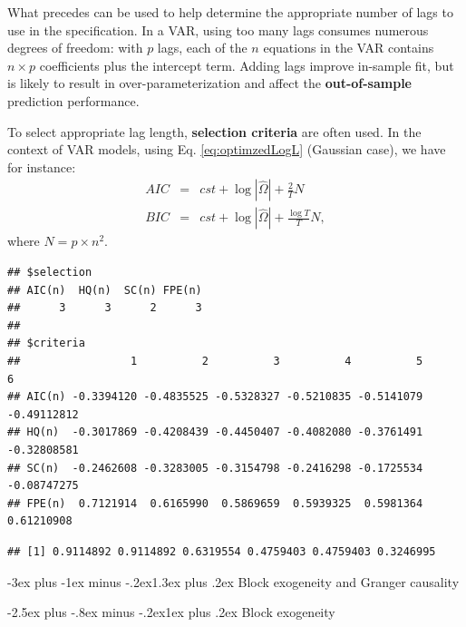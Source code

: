 \documentclass[
  11pt,
]{book}
\makeatletter
\renewcommand\section{\@startsection{section}{1}{\z@}
  {-3ex plus -1ex minus -.2ex}{1.3ex plus .2ex}
  {\normalfont\Large\bfseries\color{TextbookInk}}}
\renewcommand\subsection{\@startsection{subsection}{2}{\z@}
  {-2.5ex plus -.8ex minus -.2ex}{1ex plus .2ex}
  {\normalfont\large\bfseries\color{TextbookInk}}}
\theoremstyle{definition}
\theoremstyle{definition}
\theoremstyle{definition}
\theoremstyle{definition}
\theoremstyle{remark}
\makeatother
\begin{document}
What precedes can be used to help determine the appropriate number of lags to use in the specification. In a VAR, using too many lags consumes numerous degrees of freedom: with \(p\) lags, each of the \(n\) equations in the VAR contains \(n\times p\) coefficients plus the intercept term. Adding lags improve in-sample fit, but is likely to result in over-parameterization and affect the \textbf{out-of-sample} prediction performance.

To select appropriate lag length, \textbf{selection criteria} are often used. In the context of VAR models, using Eq. \eqref{eq:optimzedLogL} (Gaussian case), we have for instance:
\begin{eqnarray*}
AIC & = & cst + \log\left|\hat{\Omega}\right|+\frac{2}{T}N\\
BIC & = & cst + \log\left|\hat{\Omega}\right|+\frac{\log T}{T}N,
\end{eqnarray*}
where \(N=p \times n^{2}\).

\begin{verbatim}
## $selection
## AIC(n)  HQ(n)  SC(n) FPE(n) 
##      3      3      2      3 
## 
## $criteria
##                 1          2          3          4          5           6
## AIC(n) -0.3394120 -0.4835525 -0.5328327 -0.5210835 -0.5141079 -0.49112812
## HQ(n)  -0.3017869 -0.4208439 -0.4450407 -0.4082080 -0.3761491 -0.32808581
## SC(n)  -0.2462608 -0.3283005 -0.3154798 -0.2416298 -0.1725534 -0.08747275
## FPE(n)  0.7121914  0.6165990  0.5869659  0.5939325  0.5981364  0.61210908
\end{verbatim}

\begin{verbatim}
## [1] 0.9114892 0.9114892 0.6319554 0.4759403 0.4759403 0.3246995
\end{verbatim}

\section{Block exogeneity and Granger causality}\label{BlockGranger}

\subsection{Block exogeneity}\label{block-exogeneity}
\end{document}
